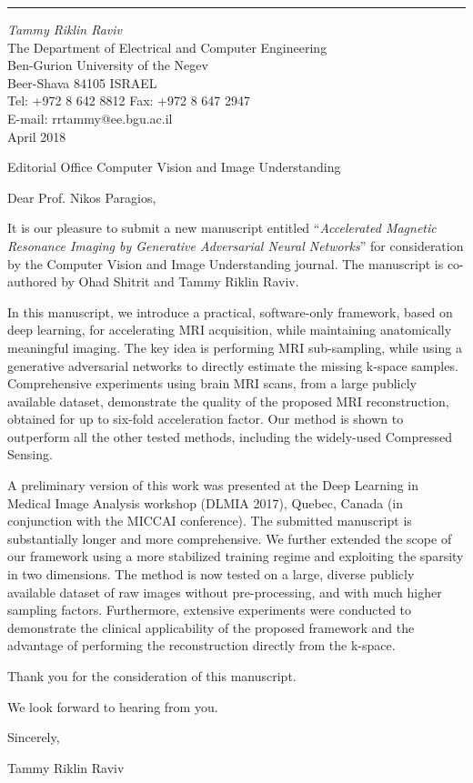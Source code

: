 \documentclass[12pt]{article}
\begin{document}
\thispagestyle{empty}


\sloppy

\vskip0.3cm
\hrule width11.5cm height1pt %
\vskip0.1cm
{\it Tammy Riklin Raviv}\\[0.05cm]
{\small The Department of Electrical and Computer Engineering} \\[0.07cm]
{\small Ben-Gurion University of the Negev} \\
{\small Beer-Shava 84105 {\hskip6pt} ISRAEL}\\[0.1cm]
{\scriptsize Tel: +972 8 642 8812}\hspace{8pt}
               {\scriptsize Fax: +972 8 647 2947}\\
{\scriptsize E-mail: \hspace{1pt} rrtammy@ee.bgu.ac.il}\\

\vspace{-0.7cm}
\hfill April 2018

Editorial Office
Computer Vision and Image Understanding
\vspace{0.2cm}

Dear Prof. Nikos Paragios,


\vspace{0.2cm}

It is our pleasure to submit a new manuscript entitled  ``{\it Accelerated Magnetic Resonance Imaging by Generative Adversarial Neural Networks}'' for
consideration by the Computer Vision and Image Understanding journal. 
The manuscript is co-authored by Ohad Shitrit and Tammy Riklin Raviv.

In this manuscript, we introduce a practical, software-only framework, based on deep learning, for accelerating MRI acquisition, while maintaining anatomically meaningful imaging. The key idea is performing MRI sub-sampling, while using a generative adversarial networks to directly estimate the missing k-space samples.
Comprehensive experiments using brain MRI scans, from a large publicly available dataset, demonstrate the quality of the proposed MRI reconstruction, obtained for up to six-fold acceleration factor. 
Our method is shown to outperform all the other tested methods, including the widely-used Compressed Sensing.


A preliminary version of this work was presented at the Deep Learning in Medical Image Analysis workshop (DLMIA 2017), Quebec, Canada
(in conjunction with the MICCAI conference). The submitted manuscript is substantially
longer and more comprehensive. We further extended the scope of our framework using a more stabilized training regime and exploiting the sparsity in two dimensions. The method is now tested on a large, diverse publicly available dataset of raw images without pre-processing, and with much higher sampling factors. Furthermore, extensive experiments were conducted to demonstrate the clinical applicability of the proposed framework and the advantage of performing the reconstruction directly from the k-space.

Thank you for the consideration of this manuscript. 

We look forward to hearing from you.

\vspace{1cm}


Sincerely,

\vspace{0.2cm}

Tammy Riklin Raviv
\end{document}
